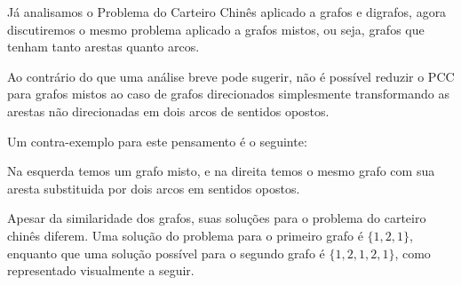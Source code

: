 \documentclass[12pt, a4paper]{article}
\begin{document}
    Já analisamos o Problema do Carteiro Chinês aplicado a grafos e digrafos, agora discutiremos o mesmo problema aplicado a grafos mistos, ou seja, grafos que tenham tanto arestas quanto arcos.

    Ao contrário do que uma análise breve pode sugerir, não é possível reduzir o PCC para grafos mistos ao caso de grafos direcionados simplesmente transformando as arestas não direcionadas em dois arcos de sentidos opostos.

    Um contra-exemplo para este pensamento é o seguinte:

    \begin{center}
        \hspace{3cm}%
    \end{center}

    Na esquerda temos um grafo misto, e na direita temos o mesmo grafo com sua aresta substituida por dois arcos em sentidos opostos. 

    Apesar da similaridade dos grafos, suas soluções para o problema do carteiro chinês diferem.
    \sloppy Uma solução do problema para o primeiro grafo é $\{1, 2, 1\}$, enquanto que uma solução possível para o segundo grafo é $\{1, 2, 1, 2, 1\}$, como representado visualmente a seguir.
\end{document}
